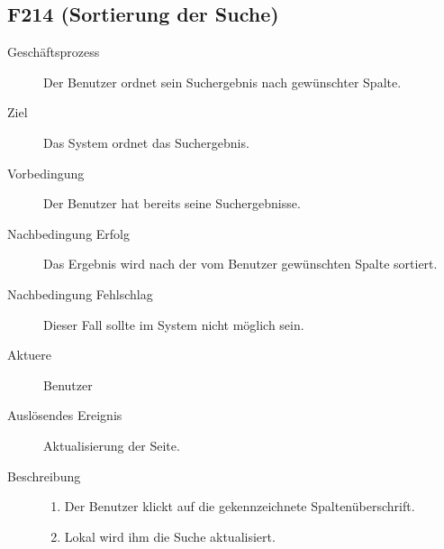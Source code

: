 \subsection{F214 (Sortierung der Suche)}
\begin{description}
  \item[Geschäftsprozess]Der Benutzer ordnet sein Suchergebnis nach gewünschter Spalte.
  \item[Ziel]Das System ordnet das Suchergebnis.
  \item[Vorbedingung]Der Benutzer hat bereits seine Suchergebnisse.
  \item[Nachbedingung Erfolg]Das Ergebnis wird nach der vom Benutzer gewünschten Spalte sortiert.
  \item[Nachbedingung Fehlschlag]Dieser Fall sollte im System nicht möglich sein.
  \item[Aktuere]Benutzer
  \item[Auslösendes Ereignis]Aktualisierung der Seite.
  \item[Beschreibung]
    \begin{enumerate}
      \item Der Benutzer klickt auf die gekennzeichnete Spaltenüberschrift.
      \item Lokal wird ihm die Suche aktualisiert.
    \end{enumerate}
\end{description}

